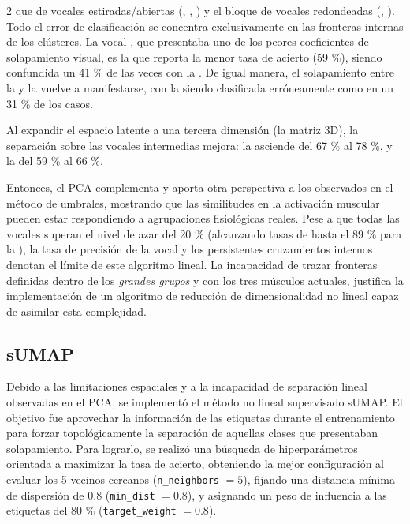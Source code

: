 \documentclass[11pt, letterpaper]{article}
\begin{document}
\begin{multicols*}{2}
\noindent que de vocales estiradas/abiertas (, , ) y el bloque de vocales redondeadas (, ). Todo el error de clasificación se concentra exclusivamente en las fronteras internas de los clústeres. La vocal , que presentaba uno de los peores coeficientes de solapamiento visual, es la que reporta la menor tasa de acierto (59 \%), siendo confundida un 41 \% de las veces con la . De igual manera, el solapamiento entre la  y la  vuelve a manifestarse, con la  siendo clasificada erróneamente como  en un 31 \% de los casos.

Al expandir el espacio latente a una tercera dimensión (la matriz 3D), la separación sobre las vocales intermedias mejora: la  asciende del 67 \% al 78 \%, y la  del 59 \% al 66 \%.

Entonces, el PCA complementa y aporta otra perspectiva a los  observados en el método de umbrales, mostrando que las similitudes en la activación muscular pueden estar respondiendo a agrupaciones fisiológicas reales. Pese a que todas las vocales superan el nivel de azar del 20 \% (alcanzando tasas de hasta el 89 \% para la ), la tasa de precisión de la vocal  y los persistentes cruzamientos internos denotan el límite de este algoritmo lineal. La incapacidad de trazar fronteras definidas dentro de los \textit{grandes grupos}  y  con los tres músculos actuales, justifica la implementación de un algoritmo de reducción de dimensionalidad no lineal capaz de asimilar esta complejidad.

\subsection{sUMAP}

Debido a las limitaciones espaciales y a la incapacidad de separación lineal observadas en el PCA, se implementó el método no lineal supervisado sUMAP. El objetivo fue aprovechar la información de las etiquetas durante el entrenamiento para forzar topológicamente la separación de aquellas clases que presentaban solapamiento. Para lograrlo, se realizó una búsqueda de hiperparámetros orientada a maximizar la tasa de acierto, obteniendo la mejor configuración al evaluar los 5 vecinos cercanos (\texttt{n\_neighbors} $=5$), fijando una distancia mínima de dispersión de $0.8$ (\texttt{min\_dist} $=0.8$), y asignando un peso de influencia a las etiquetas del 80 \% (\texttt{target\_weight} $=0.8$).


\end{multicols*}
\end{document}

